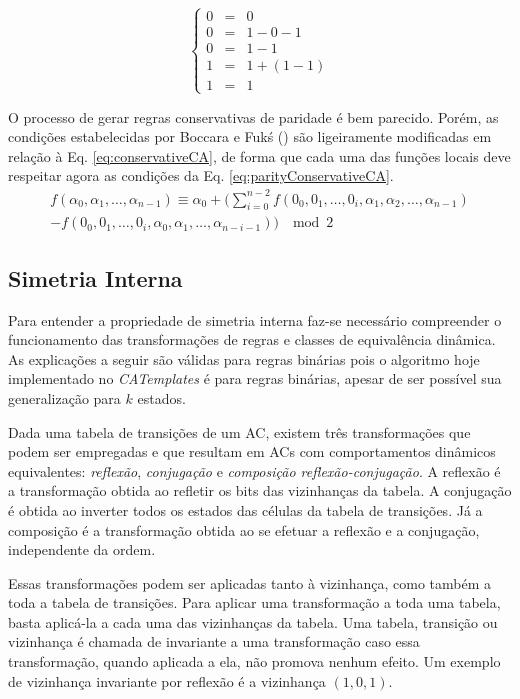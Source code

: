 \begin{equation}
\left\{\begin{matrix}
 0 & = & 0 \\ 
 0 & = & 1 - 0 - 1 \\ 
 0 & = & 1 - 1 \\ 
 1 & = & 1 + (1 - 1)\\ 
 1 & = & 1 
\end{matrix}\right.
\label{eq:conservativeAC204}
\end{equation}

O processo de gerar regras conservativas de paridade é bem parecido. Porém, as condições estabelecidas por Boccara e Fukś (\citeyear{boccara2002}) são ligeiramente modificadas em relação à Eq. \eqref{eq:conservativeCA}, de forma que cada uma das funções locais deve respeitar agora as condições da Eq. \eqref{eq:parityConservativeCA}.
\begin{equation}
\begin{split}
f(\alpha_0,\alpha_1, \dots,\alpha_{n-1}) \equiv \alpha_0 + (\sum_{i=0}^{n-2}f(0_0,0_1, \dots,0_i,\alpha_1,\alpha_2, \dots,\alpha_{n-1}) \\- f(0_0,0_1, \dots,0_i,\alpha_0,\alpha_1, \dots,\alpha_{n-i-1})) \; \mod 2
\label{eq:parityConservativeCA}
\end{split}
\end{equation}


\subsection{Simetria Interna}
Para entender a propriedade de simetria interna faz-se necessário compreender o funcionamento das transformações de regras e classes de equivalência dinâmica. As explicações a seguir são válidas para regras binárias pois o algoritmo hoje implementado no \textit{CATemplates} é para regras binárias, apesar de ser possível sua generalização para $k$ estados.

Dada uma tabela de transições de um AC, existem três transformações que podem ser empregadas e que resultam em ACs com comportamentos dinâmicos equivalentes: \textit{reflexão}, \textit{conjugação} e \textit{composição reflexão-conjugação}. A reflexão é a transformação obtida ao refletir os bits das vizinhanças da tabela. A conjugação é obtida ao inverter todos os estados das células da tabela de transições. Já a composição é a transformação obtida ao se efetuar a reflexão e a conjugação, independente da ordem.

Essas transformações podem ser aplicadas tanto à vizinhança, como também a toda a tabela de transições. Para aplicar uma transformação a toda uma tabela, basta aplicá-la a cada uma das vizinhanças da tabela. Uma tabela, transição ou vizinhança é chamada de invariante a uma transformação caso essa transformação, quando aplicada a ela, não promova nenhum efeito. Um exemplo de vizinhança invariante por reflexão é a vizinhança $(1,0,1)$.

